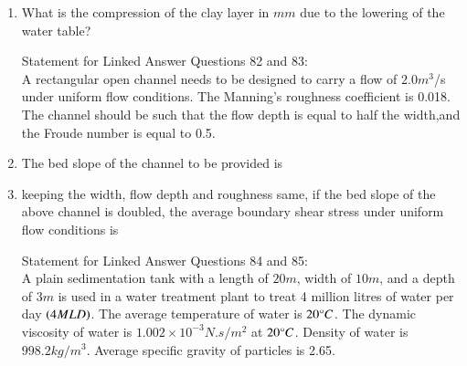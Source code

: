 \documentclass[journal]{IEEEtran}
\begin{document}
\begin{enumerate}[start=74]
\begin{enumerate}
\end{enumerate}
\item %
What is the compression of the clay layer in $mm$ due to the lowering of the water table?
\begin{enumerate}
\end{enumerate}
Statement for Linked Answer Questions 82 and 83:\\
A rectangular open channel needs to be designed to carry a flow of $2.0 m^3$/s under uniform flow conditions. The Manning's roughness coefficient is 0.018. The channel should be such that the flow depth is equal to half the width,and the Froude number is equal to 0.5.
\item %
The bed slope of the channel to be provided is
\begin{enumerate}
\end{enumerate}
\item %
keeping the width, flow depth and roughness same, if the bed slope of the above channel is doubled, the average boundary shear stress under uniform flow conditions is 
\begin{enumerate}
\end{enumerate}
Statement for Linked Answer Questions 84 and 85:\\
A plain sedimentation tank with a length of $20 m$, width of $10 m$, and a depth of $3 m$ is used in a water treatment plant to treat 4 million litres of water per day $\left(4 MLD\right)$. The average temperature of water is $20 \degree C$. The dynamic viscosity of water is $1.002 \times 10^{-3} N.s /m^2$ at $20 \degree C$. Density of water is $998.2 kg/m^3$. Average specific gravity of particles is 2.65.

\end{enumerate}
\end{document}
